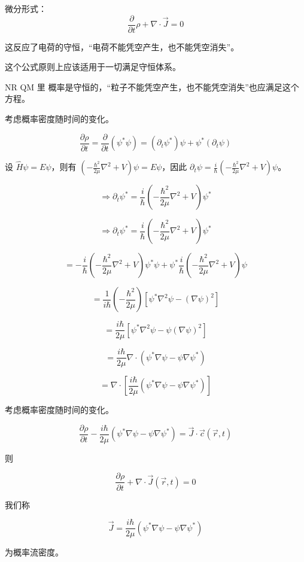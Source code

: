 \documentclass[lang=cn,10pt]{elegantbook}
\begin{document}
微分形式：
\[
\frac{\partial}{\partial t} \rho + \nabla \cdot \vec{J} = 0
\]

这反应了电荷的守恒，“电荷不能凭空产生，也不能凭空消失”。

这个公式原则上应该适用于一切满足守恒体系。

NR QM 里 概率是守恒的，“粒子不能凭空产生，也不能凭空消失”也应满足这个方程。


	考虑概率密度随时间的变化。
	
	\[
	\frac{\partial \rho}{\partial t} = \frac{\partial}{\partial t} (\psi^* \psi) = (\partial_t \psi^*) \psi + \psi^* (\partial_t \psi)
	\]
	
	设 $\hat{H} \psi = E \psi$，则有 $(-\frac{\hbar^2}{2\mu} \nabla^2 + V) \psi = E \psi$，因此 $\partial_t \psi = \frac{i}{\hbar} (-\frac{\hbar^2}{2\mu} \nabla^2 + V) \psi$。
	
	\[
	\Rightarrow \partial_t \psi^* = \frac{i}{\hbar} (-\frac{\hbar^2}{2\mu} \nabla^2 + V) \psi^*
	\]
	
	\[
	\Rightarrow \partial_t \psi^* = \frac{i}{\hbar} (-\frac{\hbar^2}{2\mu} \nabla^2 + V) \psi^*
	\]
	
	\[
	= -\frac{i}{\hbar} (-\frac{\hbar^2}{2\mu} \nabla^2 + V) \psi^* \psi + \psi^* \frac{i}{\hbar} (-\frac{\hbar^2}{2\mu} \nabla^2 + V) \psi
	\]
	
	\[
	= \frac{1}{i\hbar} \left( -\frac{\hbar^2}{2\mu} \right) \left[ \psi^* \nabla^2 \psi - (\nabla \psi)^2 \right]
	\]
	
	\[
	= \frac{i\hbar}{2\mu} \left[ \psi^* \nabla^2 \psi - \psi (\nabla \psi)^2 \right]
	\]
	
	\[
	= \frac{i\hbar}{2\mu} \nabla \cdot (\psi^* \nabla \psi - \psi \nabla \psi^*)
	\]
	
	\[
	= \nabla \cdot \left[ \frac{i\hbar}{2\mu} (\psi^* \nabla \psi - \psi \nabla \psi^*) \right]
	\]
	
考虑概率密度随时间的变化。

\[
\frac{\partial \rho}{\partial t} - \frac{i\hbar}{2\mu} (\psi^* \nabla \psi - \psi \nabla \psi^*) = \vec{J} \cdot \vec{c}(\vec{r},t)
\]

则

\[
\frac{\partial \rho}{\partial t} + \nabla \cdot \vec{J}(\vec{r},t) = 0
\]

我们称

\[
\vec{J} = \frac{i\hbar}{2\mu} (\psi^* \nabla \psi - \psi \nabla \psi^*)
\]

为概率流密度。
\end{document}
